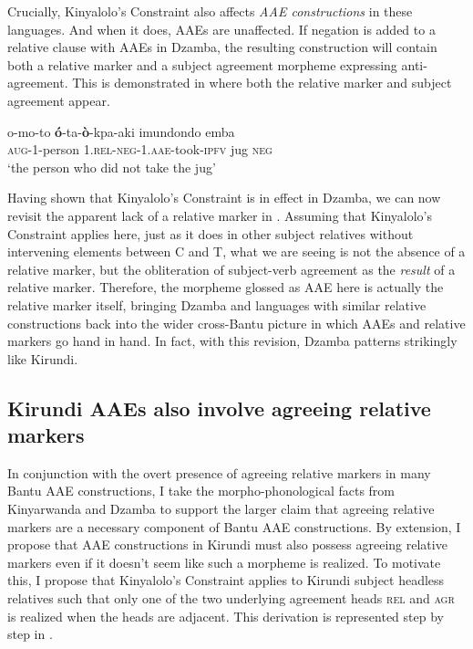 \documentclass[output=paper,colorlinks,citecolor=brown
]{langscibook}
\begin{document}
 Crucially, Kinyalolo's Constraint also affects \textit{AAE constructions} in these languages. And when it does, AAEs are unaffected. If negation is added to a relative clause with AAEs in Dzamba, the resulting construction will contain both a relative marker and a subject agreement morpheme expressing anti-agreement. This is demonstrated in  where both the relative marker and subject agreement appear.


\ea \label{ex:myers:dz2}  
\gll o-mo-to {\bfseries  ó}-ta-{\bfseries  ò}-kpa-aki imundondo emba\\
\textsc{aug}-1-person \textsc{1.rel-neg-1.aae}-took-\textsc{ipfv} jug \textsc{neg}\\
\glt `the person who did not take the jug' \hfill{\citep{Bokamba:1976}}
\z




Having shown that Kinyalolo's Constraint is in effect in Dzamba, we can now revisit the apparent lack of a relative marker in . Assuming that Kinyalolo's Constraint applies here, just as it does in other subject relatives without intervening elements between C and T, what we are seeing is not the absence of a relative marker, but the obliteration of subject-verb agreement as the \emph{result} of a relative marker. Therefore, the morpheme glossed as \textsc{AAE} here is actually the relative marker itself, bringing Dzamba and languages with similar relative constructions back into the wider cross-Bantu picture in which AAEs and relative markers go hand in hand. In fact, with this revision, Dzamba patterns strikingly like Kirundi.



\subsection{Kirundi AAEs also involve agreeing relative markers} \label{sec:myers:kirrel}

In conjunction with the overt presence of agreeing relative markers in many Bantu AAE constructions, I take the morpho-phonological facts from Kinyarwanda and Dzamba to support the larger claim that agreeing relative markers are a necessary component of Bantu AAE constructions. By extension, I propose that AAE constructions in Kirundi must also possess agreeing relative markers even if it doesn't seem like such a morpheme is realized. To motivate this, I propose that Kinyalolo's Constraint applies to Kirundi subject headless relatives such that only one of the two underlying agreement heads \textendash{} \textsc{rel} and \textsc{agr} \textendash{}  is realized when the heads are adjacent. This derivation is represented step by step in . 
\end{document}
